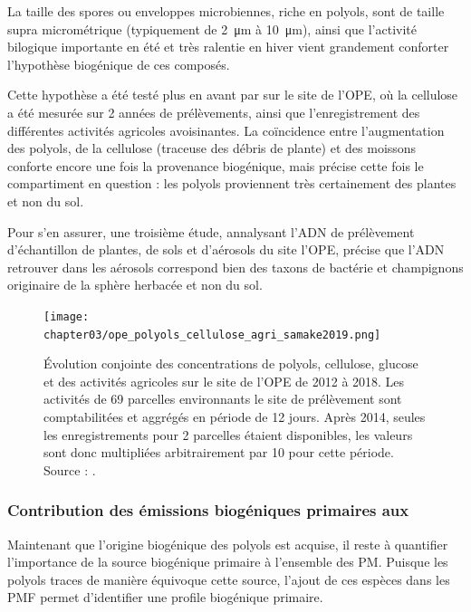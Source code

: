 La taille des spores ou enveloppes microbiennes, riche en polyols, sont de taille supra
micrométrique (typiquement de \SI{2}{\micro\m} à \SI{10}{\micro\m}), ainsi que l'activité
bilogique importante en été et très ralentie en hiver vient grandement conforter
l'hypothèse biogénique de ces composés.

Cette hypothèse a été testé plus en avant par \cite{samakeArabitol2019} sur le site de
l'OPE, où la cellulose a été mesurée sur 2 années de prélèvements, ainsi que
l'enregistrement des différentes activités agricoles avoisinantes.
La coïncidence entre l'augmentation des polyols, de la cellulose (traceuse des débris de
plante) et des moissons conforte encore une fois la provenance biogénique, mais précise
cette fois le compartiment en question : les polyols proviennent très certainement des
plantes et non du sol.

Pour s'en assurer, une troisième étude, annalysant l'ADN de prélèvement d'échantillon
de plantes, de sols et d'aérosols du site l'OPE, \autocite{samakeHigh2020} précise que
l'ADN retrouver dans les aérosols correspond bien des taxons de bactérie et champignons
originaire de la sphère herbacée et non du sol.

\begin{figure}[ht]
    \centering
    \texttt{[image: chapter03/ope\_polyols\_cellulose\_agri\_samake2019.png]}
    \caption{
        Évolution conjointe des concentrations de polyols, cellulose, glucose et des
        activités agricoles sur le site de l'OPE de 2012 à 2018.
        Les activités de 69 parcelles environnants le site de prélèvement sont
        comptabilitées et aggrégés en période de 12 jours.
        Après 2014, seules les enregistrements pour 2 parcelles étaient disponibles, les
        valeurs sont donc multipliées arbitrairement par 10 pour cette période.
        Source : \cite[figure 6]{samakeArabitol2019}.
    }%
    \label{fig:ope_polyols_cellullose_agri}
\end{figure}

\subsubsection{Contribution des émissions biogéniques primaires aux \PMdix}%
\label{ssub:contribution_des_émissions_biogéniques_primaires_aux_pmdix}

Maintenant que l'origine biogénique des polyols est acquise, il reste à quantifier
l'importance de la source biogénique primaire à l'ensemble des PM.
Puisque les polyols traces de manière équivoque cette source, l'ajout de ces espèces dans
les PMF permet d'identifier une profile biogénique primaire.

